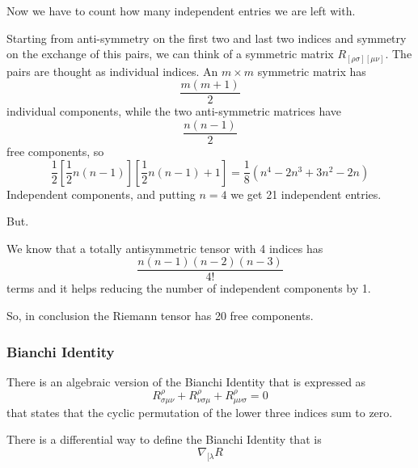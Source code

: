 Now we have to count how many independent entries we are left with.\par
Starting from anti-symmetry on the first two and last two indices and symmetry on the exchange of this pairs, we can think of a symmetric matrix $R_{[\rho \sigma ][\mu \nu ]}$. The pairs are thought as individual indices. An $m\times m$ symmetric matrix has 
\[
\frac{m\left( m+1 \right)}{2}
\]
individual components, while the two anti-symmetric matrices have
\[
\frac{n\left( n-1 \right)}{2}
\]
free components, so
\[
	\frac{1}{2} \left[ \frac{1}{2} n\left( n-1 \right)\right] \left[ \frac{1}{2} n \left( n-1 \right)+1\right] = \frac{1}{8} \left( n^{4} -2n^{3} +3n^{2} -2n \right)
\]
Independent components, and putting $n=4$ we get 21 independent entries. \par
But.\par
We know that a totally antisymmetric tensor with 4 indices has
\[
\frac{n\left( n-1 \right)\left( n-2 \right)\left( n-3 \right)}{4!}
\]
terms and it helps reducing the number of independent components by 1.\par
So, in conclusion the Riemann tensor has 20 free components.\par
\subsubsection{Bianchi Identity}
There is an algebraic version of the Bianchi Identity that is expressed as
\begin{equation}
R^{\rho }_{\sigma \mu \nu } + R^{\rho }_{\nu \sigma \mu } + R^{\rho }_{\mu \nu \sigma } = 0
\end{equation}
that states that the cyclic permutation of the lower three indices sum to zero.\par
There is a differential way to define the Bianchi Identity that is
\begin{equation}
	\nabla_{[\lambda }R
\end{equation}

































